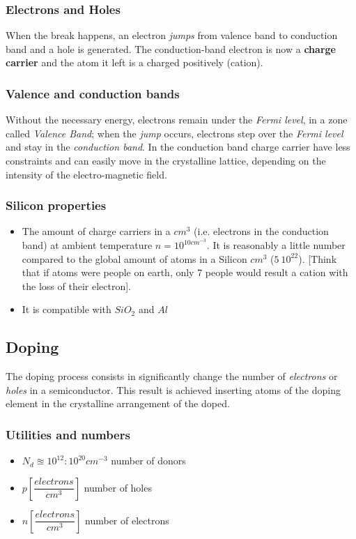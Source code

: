 \documentclass[12pt]{article}
\newcommand{\B}{\textbf}
\newcommand{\I}{\textit}
\newcommand{\bite}{\begin{itemize}} %
\newcommand{\fite}{\end{itemize}}   %
\begin{document}
\subsubsection{Electrons and Holes}
When the break happens, an electron \I{jumps} from valence band to conduction band and a hole is generated. The conduction-band electron is now a \B{charge carrier} and the atom it left is a charged positively (cation). 
\subsubsection{Valence and conduction bands}
Without the necessary energy, electrons remain under the \I{Fermi level}, in a zone called \I{Valence Band}; when the \I{jump} occurs, electrons step over the \I{Fermi level} and stay in the \I{conduction band}. In the conduction band charge carrier have less constraints and can easily move in the crystalline lattice, depending on the intensity of the electro-magnetic field.
\subsubsection{Silicon properties}
\bite
	\item The amount of charge carriers in a $cm^3$ (i.e. electrons in the conduction band) at ambient temperature $n = 10^{10 cm^{-3}}$. It is reasonably a little number compared to the global amount of atoms in a Silicon $cm^3$ ($5 \ 10^22$). [Think that if atoms were people on earth, only 7 people would result a cation with the loss of their electron]. 
	\item It is compatible with $SiO_2$ and $Al$
\fite

\subsection{Doping}
The doping process consists in significantly change the number of \textit{electrons }or \textit{holes} in a semiconductor.
This result is achieved inserting atoms of the doping element in the crystalline arrangement of the doped.
\subsubsection{Utilities and numbers}
\begin{itemize}
	\item $N_{d} \approxeq 10^{12} : 10^{20} cm^{-3}$ number of donors
	\item $p 	[\dfrac{electrons}{cm^3}]$ number of holes 
	\item $n 	[\dfrac{electrons}{cm^3}]$ number of electrons 
\end{itemize}
\end{document}
